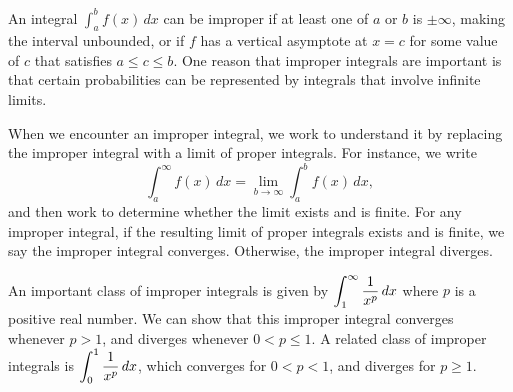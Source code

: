 \begin{summary}
  \item An integral $\int_a^b f(x) \, dx$ can be improper if at least one of $a$ or $b$ is $\pm \infty$, making the interval unbounded, or if $f$ has a vertical asymptote at $x = c$ for some value of $c$ that satisfies $a \le c \le b$.  One reason that improper integrals are important is that certain probabilities can be represented by integrals that involve infinite limits.
  \item When we encounter an improper integral, we work to understand it by replacing the improper integral with a limit of proper integrals.  For instance, we write $$\int_a^\infty f(x) \, dx = \lim_{b \to \infty} \int_a^b f(x) \, dx,$$
  and then work to determine whether the limit exists and is finite.  For any improper integral, if the resulting limit of proper integrals exists and is finite, we say the improper integral converges.  Otherwise, the improper integral diverges.
  \item An important class of improper integrals is given by $\displaystyle\int_1^{\infty} \frac{1}{x^p} \, dx$ where $p$ is a positive real number.  We can show that this improper integral converges whenever $p > 1$, and diverges whenever $0 < p \le 1$.  A related class of improper integrals is $\displaystyle \int_0^1 \frac{1}{x^p} \, dx$, which converges for $0 < p < 1$, and diverges for $p \ge 1$.
\end{summary}


 

\cleardoublepage